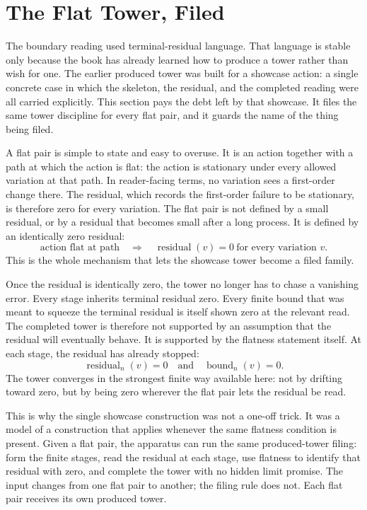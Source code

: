 \section{The Flat Tower, Filed}

The boundary reading used terminal-residual language. That language is stable
only because the book has already learned how to produce a tower rather than
wish for one. The earlier produced tower was built for a showcase action: a
single concrete case in which the skeleton, the residual, and the completed
reading were all carried explicitly. This section pays the debt left by that
showcase. It files the same tower discipline for every flat pair, and it guards
the name of the thing being filed.

A flat pair is simple to state and easy to overuse. It is an action together
with a path at which the action is flat: the action is stationary under every
allowed variation at that path. In reader-facing terms, no variation sees a
first-order change there. The residual, which records the first-order failure
to be stationary, is therefore zero for every variation. The flat pair is not
defined by a small residual, or by a residual that becomes small after a long
process. It is defined by an identically zero residual:
\[
  \text{action flat at path}
  \quad\Longrightarrow\quad
  \operatorname{residual}(v)=0
  \ \text{for every variation } v.
\]
This is the whole mechanism that lets the showcase tower become a filed family.

Once the residual is identically zero, the tower no longer has to chase a
vanishing error. Every stage inherits terminal residual zero. Every finite
bound that was meant to squeeze the terminal residual is itself shown zero at
the relevant read. The completed tower is therefore not supported by an
assumption that the residual will eventually behave. It is supported by the
flatness statement itself. At each stage, the residual has already stopped:
\[
  \operatorname{residual}_n(v)=0
  \quad\text{and}\quad
  \operatorname{bound}_n(v)=0.
\]
The tower converges in the strongest finite way available here: not by drifting
toward zero, but by being zero wherever the flat pair lets the residual be read.

This is why the single showcase construction was not a one-off trick. It was a
model of a construction that applies whenever the same flatness condition is
present. Given a flat pair, the apparatus can run the same produced-tower
filing: form the finite stages, read the residual at each stage, use flatness
to identify that residual with zero, and complete the tower with no hidden
limit promise. The input changes from one flat pair to another; the filing rule
does not. Each flat pair receives its own produced tower.


